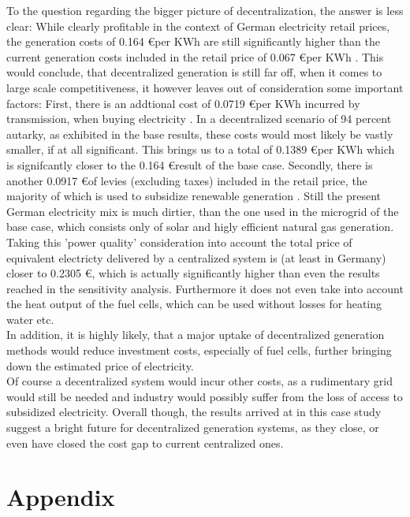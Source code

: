 \documentclass[
	11pt,								%
	DIV10,								%
	a4paper,         					%
	oneside,							%
	headheight=20pt,					%
	footheight=20pt,					%
    parskip=full,						%
    listof=totoc,						%
	bibliography=totoc,					%
	index=totoc,						%
]{scrartcl}
\begin{document}
To the question regarding the bigger picture of decentralization, the answer is less clear: While clearly profitable in the context of German electricity retail prices, the generation costs of 0.164 \euro per KWh are still significantly higher than the current generation costs included in the retail price of 0.067 \euro per KWh \cite{Monitoringbericht20182018}. This would conclude, that decentralized generation is still far off, when it comes to large scale competitiveness, it however leaves out of consideration some important factors: First, there is an addtional cost of 0.0719 \euro per KWh incurred by transmission, when buying electricity \cite{Monitoringbericht20182018}. 
In a decentralized scenario of 94 percent autarky, as exhibited in the base results, these costs would most likely be vastly smaller, if at all significant. This brings us to a total of 0.1389 \euro per KWh which is signifcantly closer to the 0.164 \euro result of the base case. Secondly, there is another 0.0917 \euro of levies (excluding taxes) included in the retail price, the majority of which is used to subsidize renewable generation \cite{Monitoringbericht20182018}. Still the present German electricity mix is much dirtier, than the one used in the microgrid of the base case, which consists only of solar and higly efficient natural gas generation. 
Taking this 'power quality' consideration into account the total price of equivalent electricty delivered by a centralized system is (at least in Germany) closer to 0.2305 \euro, which is actually significantly higher than even the results reached in the sensitivity analysis. Furthermore it does not even take into account the heat output of the fuel cells, which can be used without losses for heating water etc. \\
	In addition, it is highly likely, that a major uptake of decentralized generation methods would reduce investment costs, especially of fuel cells, further bringing down the estimated price of electricity. \\
	Of course a decentralized system would incur other costs, as a rudimentary grid would still be needed and industry would possibly suffer from the loss of access to subsidized electricity. 
	Overall though, the results arrived at in this case study suggest a bright future for decentralized generation systems, as they close, or even have closed the cost gap to current centralized ones.

\newpage
{}	

\section{Appendix}
\end{document}
